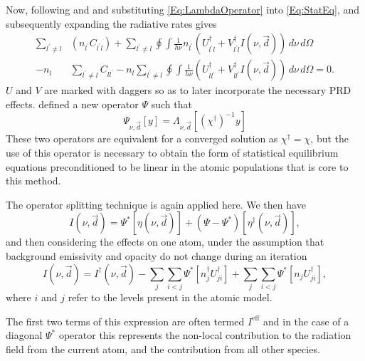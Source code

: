 Now, following \citet{Rybicki1992} and \citet{Uitenbroek2001} and substituting \eqref{Eq:LambdaOperator} into \eqref{Eq:StatEq}, and subsequently expanding the radiative rates gives
\begin{equation}
\begin{aligned}
   \sum_{l^\prime\neq l} &(n_{l^\prime}C_{l^\prime l}) +
   \sum_{l^\prime\neq l} \oint \int \frac{1}{h\nu} n_{l^\prime} (U^\dagger_{l^\prime l} + V^\dagger_{l^\prime l} I(\nu, \vec{d}))\, d\nu\, d\Omega\\
   -
   n_l &\sum_{l^\prime\neq l} C_{l l^\prime} -
   n_l \sum_{l^\prime\neq l} \oint \int \frac{1}{h\nu} (U^\dagger_{l l^\prime} + V^\dagger_{l l^\prime} I(\nu, \vec{d}))\, d\nu\, d\Omega
   = 0.
   \label{Eq:StatEqExpanded}
\end{aligned}
\end{equation}
$U$ and $V$ are marked with daggers so as to later incorporate the necessary PRD effects.
\citet{Rybicki1992} defined a new operator $\Psi$ such that
\begin{equation}
    \Psi_{\nu, \vec{d}}[y] = \Lambda_{\nu, \vec{d}}[(\chi^\dagger)^{-1}y]
\end{equation}
These two operators are equivalent for a converged solution as $\chi^\dagger = \chi$, but the use of this operator is necessary to obtain the form of statistical equilibrium equations preconditioned to be linear in the atomic populations that is core to this method.

The operator splitting technique is again applied here. We then have
\begin{equation}
    I(\nu, \vec{d}) = \Psi^*[\eta(\nu, \vec{d})] + (\Psi - \Psi^*)[\eta^\dagger(\nu, \vec{d})],
\end{equation}
and then considering the effects on one atom, under the assumption that background emissivity and opacity do not change during an iteration
\begin{equation}
    I(\nu, \vec{d}) = I^\dagger(\nu, \vec{d})
                    - \sum_j\sum_{i<j}\Psi^*[n^\dagger_j U^\dagger_{ji}]
                    + \sum_j\sum_{i<j}\Psi^*[n_j U^\dagger_{ji}],
\end{equation}
where $i$ and $j$ refer to the levels present in the atomic model.

The first two terms of this expression are often termed $I^\mathrm{eff}$ and in the case of a diagonal $\Psi^*$ operator this represents the non-local contribution to the radiation field from the current atom, and the contribution from all other species.

